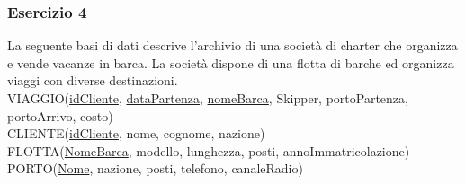 \documentclass[a4paper]{article}
\begin{document}
\subsubsection{Esercizio 4}
La seguente basi di dati descrive l'archivio di una società di charter che organizza e vende vacanze in barca. La società dispone di una flotta di barche ed organizza viaggi con diverse destinazioni.\medskip\\
VIAGGIO(\underline{idCliente}, \underline{dataPartenza}, \underline{nomeBarca}, Skipper, portoPartenza, portoArrivo, costo)\\
CLIENTE(\underline{idCliente}, nome, cognome, nazione)\\
FLOTTA(\underline{NomeBarca}, modello, lunghezza, posti, annoImmatricolazione)\\
PORTO(\underline{Nome}, nazione, posti, telefono, canaleRadio)
\end{document}
